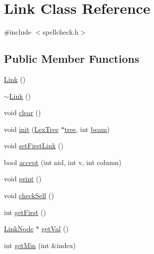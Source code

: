 \hypertarget{class_link}{\section{Link Class Reference}
\label{class_link}
}


{\ttfamily \#include $<$spellcheck.\+h$>$}

\subsection*{Public Member Functions}
\begin{DoxyCompactItemize}
\item 
\hyperlink{class_link_a1918a8473cee40bbed17b8e926cb85d9}{Link} ()
\item 
\hyperlink{class_link_a666e442abb3122fe5eb1705f1b2d650d}{$\sim$\+Link} ()
\item 
void \hyperlink{class_link_ad335e524f28d9a5e9068b41c93a3f14f}{clear} ()
\item 
void \hyperlink{class_link_a66e8edc4ed00a356b4088104207c5518}{init} (\hyperlink{class_lex_tree}{Lex\+Tree} $\ast$\hyperlink{class_link_a0a5262c88eff81b5ee6889690e895593}{tree}, int \hyperlink{class_link_aacd2e89b47ed3628d84cd539f76e1096}{beam})
\item 
void \hyperlink{class_link_ad100a6c5d7d03015961173b1af9661e9}{set\+First\+Link} ()
\item 
bool \hyperlink{class_link_a5b8c5b2cd6fd193cf9edb107d71d9c61}{accept} (int nid, int v, int column)
\item 
void \hyperlink{class_link_a0224dde29ffaf99f28e6dc64817f5775}{print} ()
\item 
void \hyperlink{class_link_a8728448d2fc214df81f87fde70468eb8}{check\+Self} ()
\item 
int \hyperlink{class_link_a4f1be7ac7a881992a26193d724c50391}{get\+First} ()
\item 
\hyperlink{struct_link_node}{Link\+Node} $\ast$ \hyperlink{class_link_afd3af269a3cdeb060409c7b61bc158b2}{get\+Val} ()
\item 
int \hyperlink{class_link_a95d63b31c8a36df0ff00c22cbea69e40}{get\+Min} (int \&index)
\end{DoxyCompactItemize}
